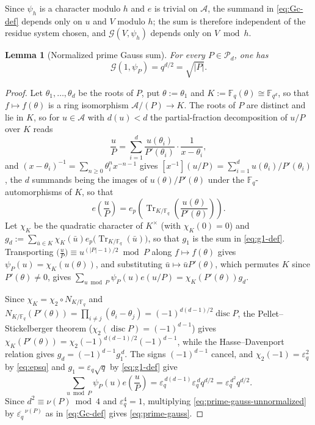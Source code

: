 \documentclass[a4paper,reqno]{amsart}
\numberwithin{equation}{section}
\newtheorem{lemma}[theorem]{Lemma}
\theoremstyle{remark}
\theoremstyle{definition}
\newcommand{\A}{\mathcal{A}}
\newcommand{\epsq}{\varepsilon_q}
\newcommand{\Gc}{\mathcal{G}}
\newcommand{\disc}{\operatorname{disc}}
\begin{document}
Since $\psi_h$ is a character modulo $h$ and $e$ is trivial on $\A$, the
summand in \eqref{eq:Gc-def} depends only on $u$ and $V$ modulo $h$; the sum
is therefore independent of the residue system chosen, and $\Gc(V,\psi_h)$
depends only on $V\bmod h$.

\begin{lemma}[Normalized prime Gauss sum]\label{lem:prime-gauss}
For every $P\in\mathcal{P}_{d}$, one has
\begin{equation}\label{eq:prime-gauss}
\Gc(1,\psi_P)=q^{d/2}=\sqrt{|P|}.
\end{equation}
\end{lemma}

\begin{proof}
Let $\theta_1,\dots,\theta_d$ be the roots of $P$, put $\theta:=\theta_1$ and
$K:=\mathbb F_q(\theta)\cong\mathbb F_{q^d}$, so that $f\mapsto f(\theta)$ is a
ring isomorphism $\A/(P)\to K$. The roots of $P$ are distinct and lie in
$K$, so for $u\in\A$ with $d(u)<d$ the partial-fraction decomposition of
$u/P$ over $K$ reads
$$
\frac{u}{P}=\sum_{i=1}^{d}\frac{u(\theta_i)}{P'(\theta_i)}
\cdot\frac{1}{x-\theta_i},
$$
and $(x-\theta_i)^{-1}=\sum_{n\ge0}\theta_i^nx^{-n-1}$ gives
$[x^{-1}](u/P)=\sum_{i=1}^{d}u(\theta_i)/P'(\theta_i)$, the $d$ summands
being the images of $u(\theta)/P'(\theta)$ under the
$\mathbb F_q$-automorphisms of $K$, so that
$$
e\!\left(\frac{u}{P}\right)
=e_p\!\left(\operatorname{Tr}_{K/\mathbb F_q}
\!\left(\frac{u(\theta)}{P'(\theta)}\right)\right).
$$
Let $\chi_K$ be the quadratic character of $K^\times$ (with $\chi_K(0)=0$)
and $g_d:=\sum_{\bar u\in K}\chi_K(\bar u)
e_p\bigl(\operatorname{Tr}_{K/\mathbb F_q}(\bar u)\bigr)$, so that $g_1$ is
the sum in \eqref{eq:g1-def}. Transporting
$\bigl(\frac uP\bigr)\equiv u^{(|P|-1)/2}\bmod P$ along $f\mapsto f(\theta)$
gives $\psi_P(u)=\chi_K(u(\theta))$, and substituting
$\bar u\mapsto\bar uP'(\theta)$, which permutes $K$ since $P'(\theta)\ne0$,
gives $\sum_{u\bmod P}\psi_P(u)e(u/P)=\chi_K(P'(\theta))g_d$.

Since $\chi_K=\chi_2\circ N_{K/\mathbb F_q}$ and
$N_{K/\mathbb F_q}(P'(\theta))=\prod_{i\ne j}(\theta_i-\theta_j)
=(-1)^{d(d-1)/2}\disc P$, the Pellet--Stickelberger theorem
\cite[Corollary~1]{Sw62} ($\chi_2(\disc P)=(-1)^{d-1}$) gives
$\chi_K(P'(\theta))=\chi_2(-1)^{d(d-1)/2}(-1)^{d-1}$, while the
Hasse--Davenport relation \cite[Chapter~11, Section~4]{IR90}
gives $g_d=(-1)^{d-1}g_1^{\,d}$. The signs $(-1)^{d-1}$ cancel, and
$\chi_2(-1)=\epsq^2$ by \eqref{eq:epsq} and $g_1=\epsq\sqrt q$ by
\eqref{eq:g1-def} give
\begin{equation}\label{eq:prime-gauss-unnormalized}
\sum_{u\bmod P}\psi_P(u)e\!\left(\frac{u}{P}\right)
=\epsq^{\,d(d-1)}\epsq^{\,d}q^{d/2}=\epsq^{\,d^2}q^{d/2}.
\end{equation}
Since $d^2\equiv\nu(P)\bmod4$ and $\epsq^4=1$, multiplying
\eqref{eq:prime-gauss-unnormalized} by $\overline{\epsq}^{\,\nu(P)}$ as in
\eqref{eq:Gc-def} gives \eqref{eq:prime-gauss}.
\end{proof}
\end{document}
